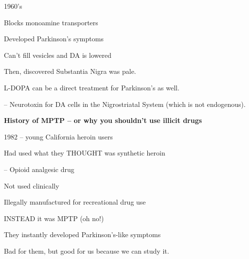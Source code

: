 \begin{coloredlist}
\begin{coloredlist}
\begin{coloredlist}
            \begin{coloredlist}
                \item 1960's
                \begin{coloredlist}
                    \item Blocks monoamine transporters
                    \begin{coloredlist}
                        \item Developed Parkinson's symptoms
                        \item Can't fill vesicles and DA is lowered
                    \end{coloredlist}
                \end{coloredlist}
                \item Then, discovered Substantia Nigra was pale.
            \end{coloredlist}
            \item L-DOPA can be a direct treatment for Parkinson's as well.
            \item {} -- Neurotoxin for DA cells in the Nigrostriatal System (which is not endogenous).
            \item \textbf{History of MPTP -- or why you shouldn't use illicit drugs}
            \begin{coloredlist}
                \item 1982 -- young California heroin users
                \item Had used what they THOUGHT was synthetic heroin
                \begin{coloredlist}
                    \item {} -- Opioid analgesic drug
                    \begin{coloredlist}
                        \item Not used clinically
                        \item Illegally manufactured for recreational drug use
                    \end{coloredlist}
                    \item INSTEAD it was MPTP (oh no!)
                    \begin{coloredlist}
                        \item They instantly developed Parkinson's-like symptoms
                        \item Bad for them, but good for us because we can study it.
                        \begin{coloredlist}

\end{coloredlist}
\end{coloredlist}
\end{coloredlist}
\end{coloredlist}
\end{coloredlist}
\end{coloredlist}
\end{coloredlist}
